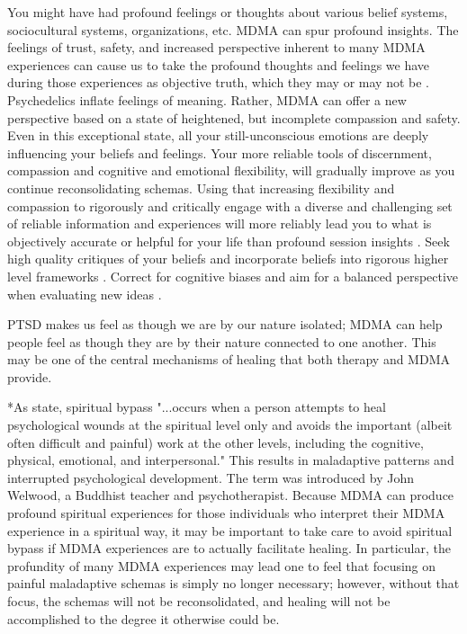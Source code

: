 \documentclass[12pt,letterpaper]{book}
\begin{document}
You might have had profound feelings or thoughts about various belief systems, sociocultural systems, organizations, etc. MDMA can spur profound insights. The feelings of trust, safety, and increased perspective inherent to many MDMA experiences can cause us to take the profound thoughts and feelings we have during those experiences as objective truth, which they may or may not be \cite{hartogsohn2018meaning}. Psychedelics inflate feelings of meaning. Rather, MDMA can offer a new perspective based on a state of heightened, but incomplete compassion and safety. Even in this exceptional state, all your still-unconscious emotions are deeply influencing your beliefs and feelings. Your more reliable tools of discernment, compassion and cognitive and emotional flexibility, will gradually improve as you continue reconsolidating schemas. Using that increasing flexibility and compassion to rigorously and critically engage with a diverse and challenging set of reliable information and experiences will more reliably lead you to what is objectively accurate or helpful for your life than profound session insights \cite{bentzMindfulInquiry}. Seek high quality critiques of your beliefs and incorporate beliefs into rigorous higher level frameworks \cite{saganDemon}. Correct for cognitive biases and aim for a balanced perspective when evaluating new ideas \cite{galefScoutMindset}.

PTSD makes us feel as though we are by our nature isolated; MDMA can help people feel as though they are by their nature connected to one another. This may be one of the central mechanisms of healing that both therapy and MDMA provide.

*As \textcite{cashwell2007Bypass} state, spiritual bypass "...occurs when a person attempts to heal psychological wounds at the spiritual level only and avoids the important (albeit often difficult and painful) work at the other levels, including the cognitive, physical, emotional, and interpersonal." This results in maladaptive patterns and interrupted psychological development. The term was introduced by John Welwood, a Buddhist teacher and psychotherapist. Because MDMA can produce profound spiritual experiences for those individuals who interpret their MDMA experience in a spiritual way, it may be important to take care to avoid spiritual bypass if MDMA experiences are to actually facilitate healing. In particular, the profundity of many MDMA experiences may lead one to feel that focusing on painful maladaptive schemas is simply no longer necessary; however, without that focus, the schemas will not be reconsolidated, and healing will not be accomplished to the degree it otherwise could be.
\end{document}
